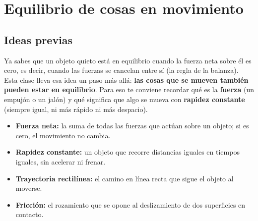 \documentclass[
  spanish,
  letterpaper,
  12pt,
  oneside,
  open=any,
  DIV=15]{scrbook}
\providecommand{\tightlist}{%
  \setlength{\itemsep}{0pt}\setlength{\parskip}{0pt}}
\newcommand{\setcolorsection}[2]{%
  \definecolor{currentsectionbg}{HTML}{#1}%
  \definecolor{currentsectionborder}{HTML}{#2}%
}
\begin{document}
\chapter{Equilibrio de cosas en
movimiento}\label{equilibrio-de-cosas-en-movimiento}

\setcolorsection{f9ebaf}{e8d68a}

\section{Ideas previas}\label{ideas-previas-5}

\begin{tcolorbox}[enhanced jigsaw, arc=.35mm, bottomrule=.15mm, bottomtitle=1mm, breakable, colback=white, colbacktitle=quarto-callout-important-color!10!white, colframe=quarto-callout-important-color-frame, coltitle=black, left=2mm, leftrule=.75mm, opacityback=0, opacitybacktitle=0.6, rightrule=.15mm, title=\textcolor{quarto-callout-important-color}{\faExclamation}\hspace{0.5em}{Anclaje Cognitivo (Prerrequisitos)}, titlerule=0mm, toprule=.15mm, toptitle=1mm]

Ya sabes que un objeto quieto está en equilibrio cuando la fuerza neta
sobre él es cero, es decir, cuando las fuerzas se cancelan entre sí (la
regla de la balanza). Esta clase lleva esa idea un paso más allá:
\textbf{las cosas que se mueven también pueden estar en equilibrio}.
Para eso te conviene recordar qué es la \textbf{fuerza} (un empujón o un
jalón) y qué significa que algo se mueva con \textbf{rapidez constante}
(siempre igual, ni más rápido ni más despacio).

\end{tcolorbox}

\begin{tcolorbox}[enhanced jigsaw, arc=.35mm, bottomrule=.15mm, bottomtitle=1mm, breakable, colback=white, colbacktitle=quarto-callout-tip-color!10!white, colframe=quarto-callout-tip-color-frame, coltitle=black, left=2mm, leftrule=.75mm, opacityback=0, opacitybacktitle=0.6, rightrule=.15mm, title=\textcolor{quarto-callout-tip-color}{\faLightbulb}\hspace{0.5em}{Apoyo Procedimental (Vocabulario Clave)}, titlerule=0mm, toprule=.15mm, toptitle=1mm]

\begin{itemize}
\tightlist
\item
  \textbf{Fuerza neta:} la suma de todas las fuerzas que actúan sobre un
  objeto; si es cero, el movimiento no cambia.
\item
  \textbf{Rapidez constante:} un objeto que recorre distancias iguales
  en tiempos iguales, sin acelerar ni frenar.
\item
  \textbf{Trayectoria rectilínea:} el camino en línea recta que sigue el
  objeto al moverse.
\item
  \textbf{Fricción:} el rozamiento que se opone al deslizamiento de dos
  superficies en contacto.
\end{itemize}

\end{tcolorbox}
\end{document}

